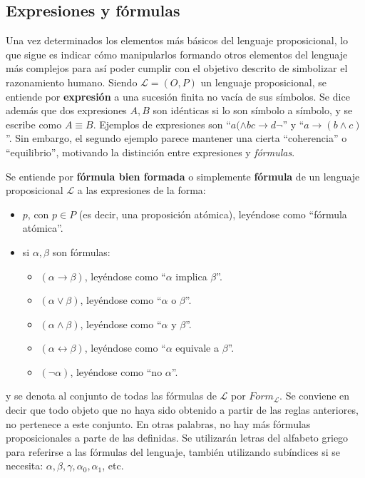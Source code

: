 \subsection{Expresiones y fórmulas}\label{subsection:lpropform}
Una vez determinados los elementos más básicos del lenguaje proposicional, lo que sigue es indicar cómo manipularlos formando otros elementos del lenguaje más complejos para así poder cumplir con el objetivo descrito de simbolizar el razonamiento humano. Siendo $\mathcal{L} = (O,P)$ un lenguaje proposicional, se entiende por \textbf{expresión} a una sucesión finita no vacía de sus símbolos. Se dice además que dos expresiones $A,B$ son idénticas si lo son símbolo a símbolo, y se escribe como $A \equiv B$. Ejemplos de expresiones son ``$a(\land bc \rightarrow d\neg$'' y ``$a \rightarrow (b \land c)$''. Sin embargo, el segundo ejemplo parece mantener una cierta ``coherencia'' o ``equilibrio'', motivando la distinción entre expresiones y \textit{fórmulas}. 

Se entiende por \textbf{fórmula bien formada} o simplemente \textbf{fórmula} de un lenguaje proposicional $\mathcal{L}$ a las expresiones de la forma:

\begin{itemize}
    \item $p$, con $p \in P$ (es decir, una proposición atómica), leyéndose como ``fórmula atómica''.
    \item si $\alpha,\beta$ son fórmulas:
    \begin{itemize}
        \item $(\alpha \rightarrow \beta)$, leyéndose como ``$\alpha$ implica $\beta$''.
        \item $(\alpha \lor \beta)$, leyéndose como ``$\alpha$ o $\beta$''.
        \item $(\alpha \land \beta)$, leyéndose como ``$\alpha$ y $\beta$''.
        \item $(\alpha \leftrightarrow \beta)$, leyéndose como ``$\alpha$ equivale a $\beta$''.
        \item $(\neg\alpha)$, leyéndose como ``no $\alpha$''.
    \end{itemize}
\end{itemize}

y se denota al conjunto de todas las fórmulas de $\mathcal{L}$ por $Form_{\mathcal{L}}$. Se conviene en decir que todo objeto que no haya sido obtenido a partir de las reglas anteriores, no pertenece a este conjunto. En otras palabras, no hay más fórmulas proposicionales a parte de las definidas. Se utilizarán letras del alfabeto griego para referirse a las fórmulas del lenguaje, también utilizando subíndices si se necesita: $\alpha,\beta,\gamma,\alpha_0,\alpha_1$, etc.


